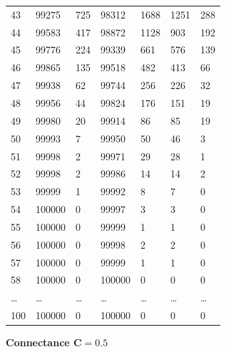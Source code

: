 \documentclass[]{article}
\begin{document}
\begin{longtable}[]{@{}lllllll@{}}
43 & 99275 & 725 & 98312 & 1688 & 1251 & 288\tabularnewline
44 & 99583 & 417 & 98872 & 1128 & 903 & 192\tabularnewline
45 & 99776 & 224 & 99339 & 661 & 576 & 139\tabularnewline
46 & 99865 & 135 & 99518 & 482 & 413 & 66\tabularnewline
47 & 99938 & 62 & 99744 & 256 & 226 & 32\tabularnewline
48 & 99956 & 44 & 99824 & 176 & 151 & 19\tabularnewline
49 & 99980 & 20 & 99914 & 86 & 85 & 19\tabularnewline
50 & 99993 & 7 & 99950 & 50 & 46 & 3\tabularnewline
51 & 99998 & 2 & 99971 & 29 & 28 & 1\tabularnewline
52 & 99998 & 2 & 99986 & 14 & 14 & 2\tabularnewline
53 & 99999 & 1 & 99992 & 8 & 7 & 0\tabularnewline
54 & 100000 & 0 & 99997 & 3 & 3 & 0\tabularnewline
55 & 100000 & 0 & 99999 & 1 & 1 & 0\tabularnewline
56 & 100000 & 0 & 99998 & 2 & 2 & 0\tabularnewline
57 & 100000 & 0 & 99999 & 1 & 1 & 0\tabularnewline
58 & 100000 & 0 & 100000 & 0 & 0 & 0\tabularnewline
\ldots{} & \ldots{} & \ldots{} & \ldots{} & \ldots{} & \ldots{} &
\ldots{}\tabularnewline
100 & 100000 & 0 & 100000 & 0 & 0 & 0\tabularnewline
\bottomrule
\end{longtable}

\textbf{Connectance \(\mathbf{C = 0.5}\)}
\end{document}
